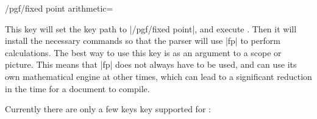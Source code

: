 \begin{key}{/pgf/fixed point arithmetic=}

  This key will set the key path to |/pgf/fixed point|, and 
  execute . Then it will install the necessary 
  commands so that the \pgfname{} parser will use |fp| to perform 
  calculations. 
  The best way to use this key is as an argument to a scope or 
  picture. This means that |fp| does not always have to be used, 
  and \pgfname{} can use its own mathematical engine at other times, 
  which can lead to a significant reduction in the time for a document 
  to compile.
  
\end{key}

  Currently there are only a few keys key supported for :
  
